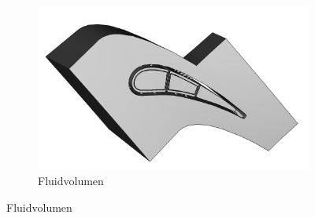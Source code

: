 \documentclass[8pt, aspectratio=169]{beamer}
\begin{document}
\begin{frame}
\begin{minipage}{\textwidth}
\begin{figure}
			\begin{subfigure}{.3\textwidth}
				\centering
				\includegraphics[width=\textwidth]{../../assets/solid/fluid.png}
				\caption{Fluidvolumen}
			\end{subfigure}
		\end{figure}
	\end{minipage}
\end{frame}
\end{document}
